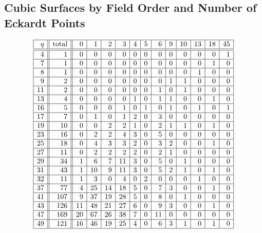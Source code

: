 
\subsection*{Cubic Surfaces by Field Order and Number of Eckardt Points}
$$
\begin{array}{|r||r||*{12}{r|}}
\hline
q  & \mbox{total}  & 0 & 1 & 2 & 3 & 4 & 5 & 6 & 9 & 10 & 13 & 18 & 45\\
\hline
\hline
4 & 1 & 0 & 0 & 0 & 0 & 0 & 0 & 0 & 0 & 0 & 0 & 0 & 1\\
\hline
7 & 1 & 0 & 0 & 0 & 0 & 0 & 0 & 0 & 0 & 0 & 0 & 1 & 0\\
\hline
8 & 1 & 0 & 0 & 0 & 0 & 0 & 0 & 0 & 0 & 0 & 1 & 0 & 0\\
\hline
9 & 2 & 0 & 0 & 0 & 0 & 0 & 0 & 0 & 1 & 1 & 0 & 0 & 0\\
\hline
11 & 2 & 0 & 0 & 0 & 0 & 0 & 0 & 1 & 0 & 1 & 0 & 0 & 0\\
\hline
13 & 4 & 0 & 0 & 0 & 0 & 1 & 0 & 1 & 1 & 0 & 0 & 1 & 0\\
\hline
16 & 5 & 0 & 0 & 0 & 1 & 0 & 1 & 0 & 1 & 0 & 1 & 0 & 1\\
\hline
17 & 7 & 0 & 1 & 0 & 1 & 2 & 0 & 3 & 0 & 0 & 0 & 0 & 0\\
\hline
19 & 10 & 0 & 0 & 2 & 2 & 1 & 0 & 2 & 1 & 1 & 0 & 1 & 0\\
\hline
23 & 16 & 0 & 2 & 2 & 4 & 3 & 0 & 5 & 0 & 0 & 0 & 0 & 0\\
\hline
25 & 18 & 0 & 4 & 3 & 3 & 2 & 0 & 3 & 2 & 0 & 0 & 1 & 0\\
\hline
27 & 11 & 0 & 2 & 2 & 2 & 2 & 0 & 2 & 1 & 0 & 0 & 0 & 0\\
\hline
29 & 34 & 1 & 6 & 7 & 11 & 3 & 0 & 5 & 0 & 1 & 0 & 0 & 0\\
\hline
31 & 43 & 1 & 10 & 9 & 11 & 3 & 0 & 5 & 2 & 1 & 0 & 1 & 0\\
\hline
32 & 11 & 1 & 3 & 0 & 4 & 0 & 2 & 0 & 0 & 0 & 1 & 0 & 0\\
\hline
37 & 77 & 4 & 25 & 14 & 18 & 5 & 0 & 7 & 3 & 0 & 0 & 1 & 0\\
\hline
41 & 107 & 9 & 37 & 19 & 28 & 5 & 0 & 8 & 0 & 1 & 0 & 0 & 0\\
\hline
43 & 126 & 11 & 48 & 21 & 27 & 6 & 0 & 9 & 3 & 0 & 0 & 1 & 0\\
\hline
47 & 169 & 20 & 67 & 26 & 38 & 7 & 0 & 11 & 0 & 0 & 0 & 0 & 0\\
\hline
49 & 121 & 16 & 46 & 19 & 25 & 4 & 0 & 6 & 3 & 1 & 0 & 1 & 0\\
\hline
\end{array}
$$

